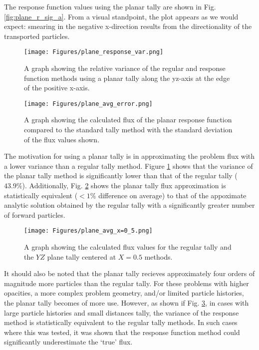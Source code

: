 \begin{chapabstract}
The response function values using the planar tally are shown in Fig. \ref{fig:plane_r_sig_a}. From a visual standpoint, the plot appears as we would expect: smearing in the negative x-direction results from the directionality of the transported particles.

\begin{figure} [h!]
	\centering
	\texttt{[image: Figures/plane\_response\_var.png]}
	\caption{A graph showing the relative variance of the regular and response function methods using a planar tally along the yz-axis at the edge of the positive x-axis.}
	\label{fig:plane_response_var}
\end{figure}

\begin{figure} [h!]
	\centering
	\texttt{[image: Figures/plane\_avg\_error.png]}
	\caption{A graph showing the calculated flux of the planar response function compared to the standard tally method with the standard deviation of the flux values shown. }
	\label{fig:plane_avg_flux}
\end{figure}

The motivation for using a planar tally is in approximating the problem flux with a lower variance than a regular tally method. Figure \ref{fig:plane_response_var} shows that the variance of the planar tally method is significantly lower than that of the regular tally ($43.9\%$).  Additionally, Fig. \ref{fig:plane_avg_flux} shows the planar tally flux approximation is statistically equivalent ($<1\%$ difference on average) to that of the appoximate analytic solution obtained by the regular tally with a significantly greater number of forward particles. 

\begin{figure} [h!]
	\centering
	\texttt{[image: Figures/plane\_avg\_x=0\_5.png]}
	\caption{A graph showing the calculated flux values for the regular tally and the $YZ$ plane tally centered at $X=0.5$ methods. }
	\label{fig:plane_avg_x=0.5.png}
\end{figure}

It should also be noted that the planar tally recieves approximately four orders of magnitude more particles than the regular tally. For these problems with higher opacities, a more complex problem geometry, and/or limited particle histories, the planar tally becomes of more use. However, as shown if Fig. \ref{fig:plane_avg_x=0.5.png}, in cases with large particle histories and small distances tally, the variance of the response method is statistically equivalent to the regular tally methods. In such cases where this was tested, it was shown that the response function method could significantly underestimate the `true' flux.


\end{chapabstract}
